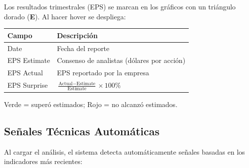 \documentclass[11pt, a4paper]{article}
\begin{document}
Los resultados trimestrales (EPS) se marcan en los gráficos con un triángulo dorado (\textbf{E}). Al hacer hover se despliega:

\begin{center}
\begin{tabular}{ll}
  \toprule
  \textbf{Campo} & \textbf{Descripción} \\
  \midrule
  Date           & Fecha del reporte \\
  EPS Estimate   & Consenso de analistas (dólares por acción) \\
  EPS Actual     & EPS reportado por la empresa \\
  EPS Surprise   & $\frac{\text{Actual} - \text{Estimate}}{\text{Estimate}} \times 100\%$ \\
  \bottomrule
\end{tabular}
\end{center}

Verde = superó estimados; Rojo = no alcanzó estimados.

\subsection{Señales Técnicas Automáticas}

Al cargar el análisis, el sistema detecta automáticamente señales basadas en los indicadores más recientes:
\end{document}
